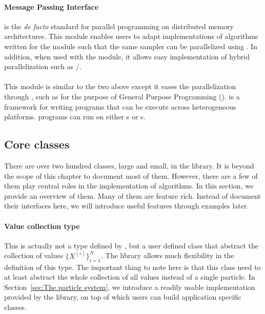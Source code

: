 \paragraph{Message Passing Interface}

\mpi is the \emph{de facto} standard for parallel programming on distributed
memory architectures. This module enables users to adapt implementations of
algorithms written for the \smp module such that the same sampler can be
parallelized using \mpi. In addition, when used with the \smp module, it
allows easy implementation of hybrid parallelization such as \mpi/\openmp.

\paragraph{\opencl}

This module is similar to the two above except it eases the parallelization
through \opencl, such as for the purpose of General Purpose \gpu Programming
(\gpgpu). \opencl is a framework for writing programs that can be execute
across heterogeneous platforms. \opencl programs can run on either \cpu{}s or
\gpu{}s.

\subsection{Core classes}
\label{sub:Core classes}

There are over two hundred classes, large and small, in the \vsmc library. It
is beyond the scope of this chapter to document most of them. However, there
are a few of them play central roles in the implementation of \smc algorithms.
In this section, we provide an overview of them. Many of them are feature
rich. Instead of document their interfaces here, we will introduce useful
features through examples later.

\paragraph{Value collection type}

This is actually not a type defined by \vsmc, but a user defined class that
abstract the collection of values $\{X^{(i)}\}_{i=1}^N$. The library allows
much flexibility in the definition of this type. The important thing to note
here is that this class need to at least abstract the whole collection of all
values instead of a single particle. In Section~\ref{sec:The particle system},
we introduce a readily usable implementation provided by the \vsmc library, on
top of which users can build application specific classes.

